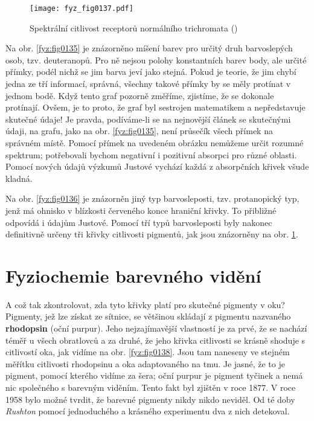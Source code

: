     \begin{figure}[ht!]  %
      \centering
      \texttt{[image: fyz\_fig0137.pdf]}
      \caption{Spektrální citlivost receptorů normálního trichromata
              (\cite[s.~477]{Feynman01})}
      \label{fyz:fig0137}
    \end{figure}
    Na obr. \ref{fyz:fig0135} je znázorněno míšení barev pro určitý druh barvoslepých osob, tzv. 
    deuteranopů. Pro ně nejsou polohy konstantních barev body, ale určité přímky, podél nichž se 
    jim barva jeví jako stejná. Pokud je teorie, že jim chybí jedna ze tří informací, správná, 
    všechny takové přímky by se měly protínat v jednom bodě. Když tento graf pozorně změříme, 
    zjistíme, že se dokonale protínají. Ovšem, je to proto, že graf byl sestrojen matematikem a 
    nepředstavuje skutečné údaje! Je pravda, podíváme-li se na nejnovější článek se skutečnými 
    údaji, na grafu, jako na obr. \ref{fyz:fig0135}, není průsečík všech přímek na správném místě. 
    Pomocí přímek na uvedeném obrázku nemůžeme určit rozumné spektrum; potřebovali bychom negativní 
    i pozitivní absorpci pro různé oblasti. Pomocí nových údajů výzkumů Justové vychází každá z 
    absorpčních křivek všude kladná. 

    Na obr. \ref{fyz:fig0136} je znázorněn jiný typ barvosleposti, tzv. protanopický typ, jenž má 
    ohnisko v blízkosti červeného konce hraniční křivky. To přibližné odpovídá i údajům Justové. 
    Pomocí tří typů barvosleposti byly nakonec definitivně určeny tři křivky citlivosti pigmentů, 
    jak jsou znázorněny na obr. \ref{fyz:fig0137}.
    
  \section{Fyziochemie barevného vidění}\label{fyz:IchapXXXVsecVI}
    A což tak zkontrolovat, zda tyto křivky platí pro skutečné pigmenty v oku? Pigmenty, jež lze 
    získat ze sítnice, se většinou skládají z pigmentu nazvaného \textbf{rhodopsin} (oční purpur). 
    Jeho nejzajímavější vlastností je za prvé, že se nachází téměř u všech obratlovců a za druhé, 
    že jeho křivka citlivosti se krásně shoduje s citlivostí oka, jak vidíme na obr. 
    \ref{fyz:fig0138}. Jsou tam naneseny ve stejném měřítku citlivosti rhodopsinu a oka adaptovaného 
    na tmu. Je jasné, že to je pigment, pomocí kterého vidíme za šera; oční purpur je pigment 
    tyčinek a nemá nic společného s barevným viděním. Tento fakt byl zjištěn v roce \num{1877}. V 
    roce 1958 bylo možné tvrdit, že barevné pigmenty nikdy nikdo neviděl. Od té doby \emph{Rushton} 
    pomocí jednoduchého a krásného experimentu dva z nich detekoval.

